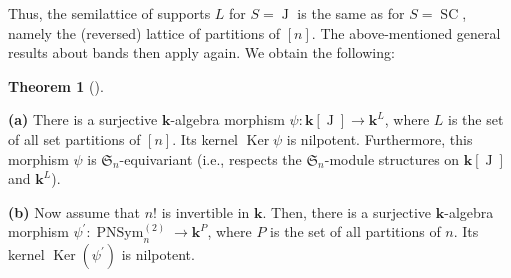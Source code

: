 \documentclass[numbers=enddot,12pt,final,onecolumn,notitlepage]{scrartcl}%
\theoremstyle{definition}
\newtheorem{theo}{Theorem}[section]
\newenvironment{theorem}[1][]
{\begin{theo}[#1]\begin{leftbar}}
{\end{leftbar}\end{theo}}
\begin{document}
Thus, the semilattice of supports $L$ for $S=\operatorname*{J}$ is the same as
for $S=\operatorname*{SC}$, namely the (reversed) lattice of partitions of
$\left[  n\right]  $. The above-mentioned general results about bands then
apply again. We obtain the following:

\begin{theorem}
\label{thm.PNSym.nil}\textbf{(a)} There is a surjective $\mathbf{k}$-algebra
morphism $\psi:\mathbf{k}\left[  \operatorname*{J}\right]  \rightarrow
\mathbf{k}^{L}$, where $L$ is the set of all set partitions of $\left[
n\right]  $. Its kernel $\operatorname*{Ker}\psi$ is nilpotent. Furthermore,
this morphism $\psi$ is $\mathfrak{S}_{n}$-equivariant (i.e., respects the
$\mathfrak{S}_{n}$-module structures on $\mathbf{k}\left[  \operatorname*{J}%
\right]  $ and $\mathbf{k}^{L}$). \medskip

\textbf{(b)} Now assume that $n!$ is invertible in $\mathbf{k}$. Then, there
is a surjective $\mathbf{k}$-algebra morphism $\psi^{\prime}%
:\operatorname*{PNSym}\nolimits_{n}^{\left(  2\right)  }\rightarrow
\mathbf{k}^{P}$, where $P$ is the set of all partitions of $n$. Its kernel
$\operatorname*{Ker}\left(  \psi^{\prime}\right)  $ is nilpotent.
\end{theorem}
\end{document}
